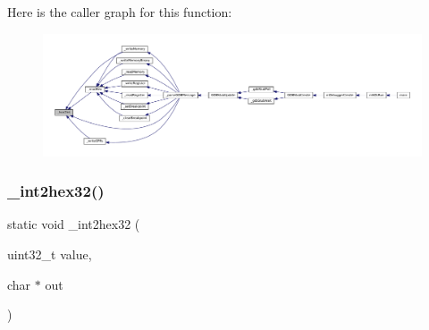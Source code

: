 Here is the caller graph for this function\+:
\nopagebreak
\begin{figure}[H]
\begin{center}
\leavevmode
\includegraphics[width=350pt]{gdb-stub_8c_acc566acd6b2a0d699a29fc52811d345e_icgraph}
\end{center}
\end{figure}
\mbox{\label{gdb-stub_8c_a77ffa276051d098347aadf57d3a8e245}} 
\subsubsection{\texorpdfstring{\+\_\+int2hex32()}{\_int2hex32()}}
{\footnotesize\ttfamily static void \+\_\+int2hex32 (\begin{DoxyParamCaption}\item[{uint32\+\_\+t}]{value,  }\item[{char $\ast$}]{out }\end{DoxyParamCaption})\hspace{0.3cm}{\ttfamily [static]}}

